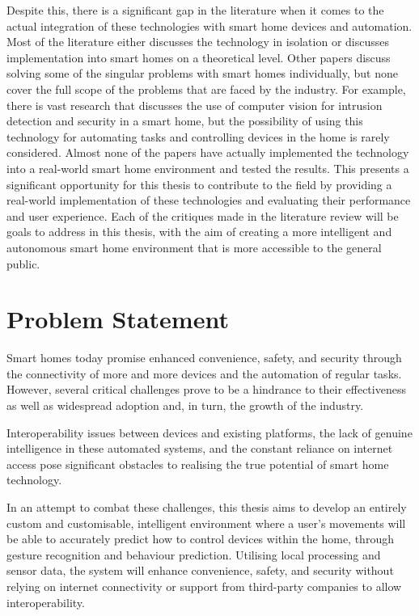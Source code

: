 Despite this, there is a significant gap in the literature when it comes to the actual integration of these technologies with smart home devices and automation.
Most of the literature either discusses the technology in isolation or discusses implementation into smart homes on a theoretical level.
Other papers discuss solving some of the singular problems with smart homes individually, but none cover the full scope of the problems that are faced by the industry.
For example, there is vast research that discusses the use of computer vision for intrusion detection and security in a smart home, but the possibility of using this technology for automating tasks and controlling devices in the home is rarely considered. 
Almost none of the papers have actually implemented the technology into a real-world smart home environment and tested the results.
This presents a significant opportunity for this thesis to contribute to the field by providing a real-world implementation of these technologies and evaluating their performance and user experience.
Each of the critiques made in the literature review will be goals to address in this thesis, with the aim of creating a more intelligent and autonomous smart home environment that is more accessible to the general public.

\section{Problem Statement}
Smart homes today promise enhanced convenience, safety, and security through the connectivity of more and more devices and the automation of regular tasks.
However, several critical challenges prove to be a hindrance to their effectiveness as well as widespread adoption and, in turn, the growth of the industry.

Interoperability issues between devices and existing platforms, the lack of genuine intelligence in these automated systems, and the constant reliance on internet access pose significant obstacles to realising the true potential of smart home technology.

In an attempt to combat these challenges, this thesis aims to develop an entirely custom and customisable, intelligent environment where a user's movements will be able to accurately predict how to control devices within the home, through gesture recognition and behaviour prediction.
Utilising local processing and sensor data, the system will enhance convenience, safety, and security without relying on internet connectivity or support from third-party companies to allow interoperability.

